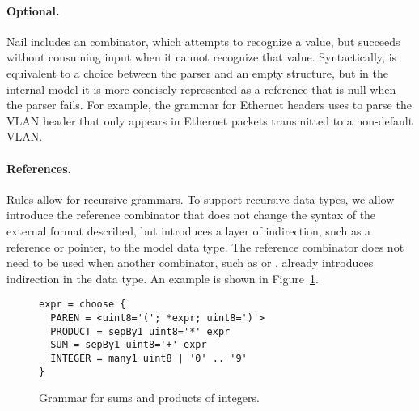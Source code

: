 

\paragraph{Optional.}
Nail includes an  combinator, which attempts to recognize a value, but succeeds
without consuming input when it cannot recognize that value. Syntactically,  is
equivalent to a choice between the parser and an empty structure, but in the internal model it is
more concisely represented as a reference that is null when the parser fails.
For example, the grammar for  Ethernet headers uses  to parse the VLAN
header that only appears in Ethernet packets transmitted to a non-default VLAN\@.

\paragraph{References.}
Rules allow for recursive grammars. To support recursive data types, we allow introduce the
reference combinator \cc{*}  that does not change the syntax of the external format described, but
introduces a layer of indirection, such as a reference or pointer, to the model data type.
The reference combinator does not need to be used when another combinator, such as  or
, already introduces indirection in the data type. An example is shown in Figure~\ref{fig:grammar-arith}.

\begin{figure}
\smaller[0.5]
\begin{verbatim}
expr = choose {
  PAREN = <uint8='('; *expr; uint8=')'>
  PRODUCT = sepBy1 uint8='*' expr
  SUM = sepBy1 uint8='+' expr
  INTEGER = many1 uint8 | '0' .. '9'
}
\end{verbatim}
\caption{Grammar for sums and products of integers.}
\label{fig:grammar-arith}
\end{figure}



